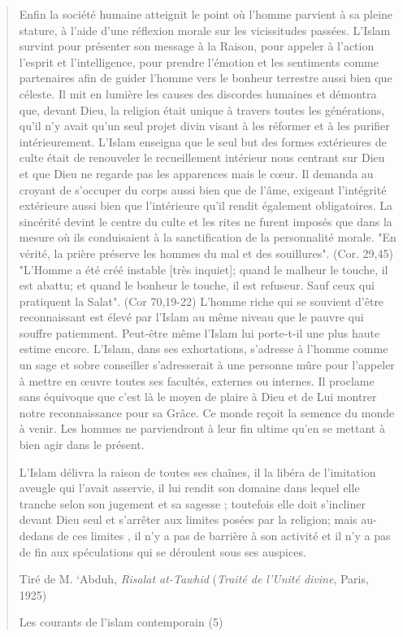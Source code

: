 \begin{quote}
Enfin la société humaine atteignit le point où l'homme parvient à sa
pleine stature, à l'aide d'une réflexion morale sur les vicissitudes
passées. L'Islam survint pour présenter son message à la Raison, pour
appeler à l'action l'esprit et l'intelligence, pour prendre l'émotion et
les sentiments comme partenaires afin de guider l'homme vers le bonheur
terrestre aussi bien que céleste. Il mit en lumière les causes des
discordes humaines et démontra que, devant Dieu, la religion était
unique à travers toutes les générations, qu'il n'y avait qu'un seul
projet divin visant à les réformer et à les purifier intérieurement.
L'Islam enseigna que le seul but des formes extérieures de culte était
de renouveler le recueillement intérieur nous centrant sur Dieu et que
Dieu ne regarde pas les apparences mais le cœur. Il demanda au croyant
de s'occuper du corps aussi bien que de l'âme, exigeant l'intégrité
extérieure aussi bien que l'intérieure qu'il rendit également
obligatoires. La sincérité devint le centre du culte et les rites ne
furent imposés que dans la mesure où ils conduisaient à la
sanctification de la personnalité morale. "En vérité, la prière préserve
les hommes du mal et des souillures". (Cor. 29,45) "L'Homme a été créé
instable {[}très inquiet{]}; quand le malheur le touche, il est abattu;
et quand le bonheur le touche, il est refuseur. Sauf ceux qui pratiquent
la Salat". (Cor 70,19-22) L'homme riche qui se souvient d'être
reconnaissant est élevé par l'Islam au même niveau que le pauvre qui
souffre patiemment. Peut-être même l'Islam lui porte-t-il une plus haute
estime encore. L'Islam, dans ses exhortations, s'adresse à l'homme comme
un sage et sobre conseiller s'adresserait à une personne mûre pour
l'appeler à mettre en œuvre toutes ses facultés, externes ou internes.
Il proclame sans équivoque que c'est là le moyen de plaire à Dieu et de
Lui montrer notre reconnaissance pour sa Grâce. Ce monde reçoit la
semence du monde à venir. Les hommes ne parviendront à leur fin ultime
qu'en se mettant à bien agir dans le présent.

L'Islam délivra la raison de toutes ses chaînes, il la libéra de
l'imitation aveugle qui l'avait asservie, il lui rendit son domaine dans
lequel elle tranche selon son jugement et sa sagesse ; toutefois elle
doit s'incliner devant Dieu seul et s'arrêter aux limites posées par la
religion; mais au-dedans de ces limites , il n'y a pas de barrière à son
activité et il n'y a pas de fin aux spéculations qui se déroulent sous
ses auspices.

Tiré de M. `Abduh, \emph{Risalat at-Tawhid} (\emph{Traité de l'Unité
divine}, Paris, 1925)

Les courants de l'islam contemporain (5)
\end{quote}

